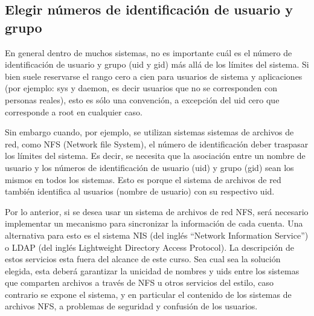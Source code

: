 \documentclass[12pt]{article}
\begin{document}
\subsection*{Elegir números de identificación de usuario y grupo}
En general dentro de muchos sistemas, no es importante cuál es el número de 
identificación de usuario y grupo (uid y gid) más allá de los límites del sistema. 
Si bien suele reservarse el rango cero a cien 
para usuarios de sistema y aplicaciones (por ejemplo: sys y daemon, es decir usuarios 
que no se corresponden con personas reales), esto es sólo una convención, 
a excepción del uid cero que corresponde a root en cualquier caso.  

Sin embargo cuando, por ejemplo, se utilizan sistemas sistemas de archivos de red, como 
NFS (Network file System), el número de identificación deber traspasar
los límites del sistema. Es decir, se necesita que la asociación entre un nombre de 
usuario y los números de identificación de usuario (uid) y grupo (gid) sean los mismos en todos
los sistemas. Esto es porque el sistema de archivos de red también identifica al
usuarios (nombre de usuario) con su respectivo uid.  

Por lo anterior, si se desea usar un sistema de archivos de red NFS,
será necesario implementar un mecanismo 
para sincronizar la información de cada cuenta. Una alternativa para esto 
es el sistema NIS (del inglés ``Network Information Service'') o LDAP (del inglés Lightweight 
Directory Access Protocol). La descripción de estos servicios 
esta fuera del alcance de este curso. Sea cual sea la solución elegida, esta deberá 
garantizar la unicidad de nombres y uids entre los sistemas que comparten 
archivos a través de NFS u otros servicios del estilo, caso contrario se expone
el sistema, y en particular el contenido de los sistemas de archivos NFS, a 
problemas de seguridad y confusión de los usuarios. 

\end{document}
